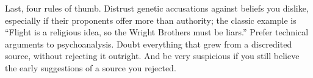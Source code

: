 Last, four rules of thumb. Distrust genetic accusations against beliefs you dislike, especially if their proponents offer more than authority; the classic example is ``Flight is a religious idea, so the Wright Brothers must be liars.'' Prefer technical arguments to psychoanalysis. Doubt everything that grew from a discredited source, without rejecting it outright. And be very suspicious if you still believe the early suggestions of a source you rejected.
